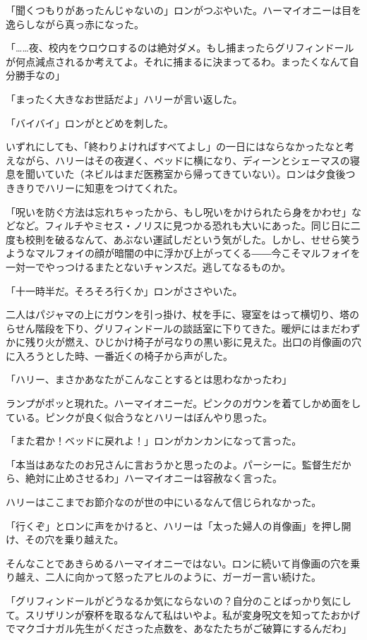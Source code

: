 \documentclass[10pt,a4paper]{article}
\begin{document}
\begin{CJK}{UTF8}{min}
「聞くつもりがあったんじゃないの」ロンがつぶやいた。ハーマイオニーは目を逸らしながら真っ赤になった。

「……夜、校内をウロウロするのは絶対ダメ。もし捕まったらグリフィンドールが何点減点されるか考えてよ。それに捕まるに決まってるわ。まったくなんて自分勝手なの」

「まったく大きなお世話だよ」ハリーが言い返した。

「バイバイ」ロンがとどめを刺した。



いずれにしても、「終わりよければすべてよし」の一日にはならなかったなと考えながら、ハリーはその夜遅く、ベッドに横になり、ディーンとシェーマスの寝息を聞いていた（ネビルはまだ医務室から帰ってきていない）。ロンは夕食後つききりでハリーに知恵をつけてくれた。

「呪いを防ぐ方法は忘れちゃったから、もし呪いをかけられたら身をかわせ」などなど。フィルチやミセス・ノリスに見つかる恐れも大いにあった。同じ日に二度も校則を破るなんて、あぶない運試しだという気がした。しかし、せせら笑うようなマルフォイの顔が暗闇の中に浮かび上がってくる――今こそマルフォイを一対一でやっつけるまたとないチャンスだ。逃してなるものか。

「十一時半だ。そろそろ行くか」ロンがささやいた。

二人はパジャマの上にガウンを引っ掛け、杖を手に、寝室をはって横切り、塔のらせん階段を下り、グリフィンドールの談話室に下りてきた。暖炉にはまだわずかに残り火が燃え、ひじかけ椅子が弓なりの黒い影に見えた。出口の肖像画の穴に入ろうとした時、一番近くの椅子から声がした。

「ハリー、まさかあなたがこんなことするとは思わなかったわ」

ランプがポッと現れた。ハーマイオニーだ。ピンクのガウンを着てしかめ面をしている。ピンクが良く似合うなとハリーはぼんやり思った。

「また君か！ベッドに戻れよ！」ロンがカンカンになって言った。

「本当はあなたのお兄さんに言おうかと思ったのよ。パーシーに。監督生だから、絶対に止めさせるわ」ハーマイオニーは容赦なく言った。

ハリーはここまでお節介なのが世の中にいるなんて信じられなかった。

「行くぞ」とロンに声をかけると、ハリーは「太った婦人の肖像画」を押し開け、その穴を乗り越えた。

そんなことであきらめるハーマイオニーではない。ロンに続いて肖像画の穴を乗り越え、二人に向かって怒ったアヒルのように、ガーガー言い続けた。

「グリフィンドールがどうなるか気にならないの？自分のことばっかり気にして。スリザリンが寮杯を取るなんて私はいやよ。私が変身呪文を知ってたおかげでマクゴナガル先生がくださった点数を、あなたたちがご破算にするんだわ」


\end{CJK}
\end{document}
